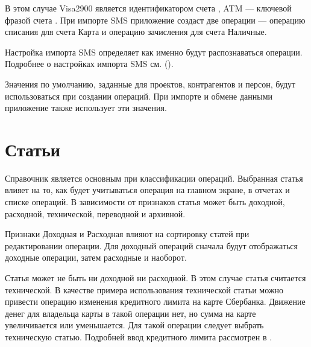 \documentclass[a4paper,10pt,russian]{sphinxmanual}
\begin{document}
\sphinxAtStartPar
В этом случае Visa2900 является идентификатором счета , ATM — ключевой фразой счета . При импорте SMS приложение создаст
две операции — операцию списания для счета Карта и операцию зачисления для счета Наличные.

\sphinxAtStartPar
Настройка импорта SMS определяет как именно будут распознаваться операции.
Подробнее о настройках импорта SMS см. {\hyperref[\detokenize{notifications:chapter-notifications}]{}} ().

\sphinxAtStartPar
Значения по умолчанию, заданные для проектов, контрагентов и персон, будут использоваться при создании операций. При
импорте и обмене данными приложение также использует эти значения.

\noindent{}

\noindent{}

\noindent{}


\section{Статьи}
\label{\detokenize{directories:id5}}
\sphinxAtStartPar
Справочник  является основным при классификации операций. Выбранная статья влияет на то, как будет учитываться
операция на главном экране, в отчетах и списке операций. В зависимости от признаков статья может быть доходной, расходной,
технической, переводной и архивной.

\sphinxAtStartPar
Признаки Доходная и Расходная влияют на сортировку статей при редактировании операции. Для доходный операций сначала
будут отображаться доходные операции, затем расходные и наоборот.

\sphinxAtStartPar
Статья может не быть ни доходной ни расходной. В этом случае статья считается технической. В качестве примера использования
технической статьи можно привести операцию изменения кредитного лимита на карте Сбербанка.
Движение денег для владельца карты в такой операции нет, но сумма на карте увеличивается или уменьшается.
Для такой операции следует выбрать техническую статью. Подробней  ввод кредитного лимита
рассмотрен в .
\end{document}

